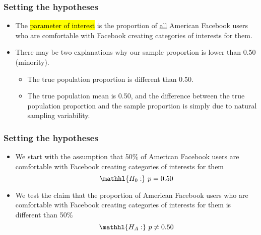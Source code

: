 \documentclass[t,compress,mathserif]{beamer}
\begin{document}

\begin{frame}
\frametitle{Setting the hypotheses}

\begin{itemize}

\item The \hl{parameter of interest} is the proportion of \underline{all} American Facebook users who are comfortable with Facebook creating categories of interests for them.

\pause

\item There may be two explanations why our sample proportion is lower than 0.50 (minority).
\begin{itemize}
\item The true population proportion is different than 0.50.
\item The true population mean is 0.50, and the difference between the true population proportion and the sample proportion is simply due to natural sampling variability.
\end{itemize}

 \end{itemize}

\end{frame}


\begin{frame}
\frametitle{Setting the hypotheses}

\begin{itemize}

\item We start with the assumption that 50\% of American Facebook users are comfortable with Facebook creating categories of interests for them
\[ \mathhl{H_0:}~p = 0.50 \]

\pause

\item We test the claim that the proportion of American Facebook users who are comfortable with Facebook creating categories of interests for them is different than 50\%
\[ \mathhl{H_A:}~p \ne 0.50 \]

\end{itemize}

\end{frame}

\end{document}
